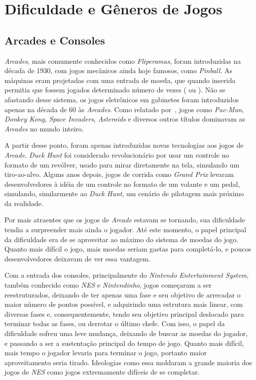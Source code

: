 
\chapter{Dificuldade e Gêneros de Jogos}
\label{cap:dificuldade e generos de jogos}
\section{Arcades e Consoles}

\textit{Arcades}, mais comumente conhecidos como \textit{Fliperamas}, foram introduzidas na década de 1930, com jogos mecânicos ainda hoje famosos, como \textit{Pinball}. As máquinas eram projetadas com uma entrada de moeda, que quando inserida permitia que fossem jogados determinado número de vezes (\textquotedbl{} ou \textquotedbl{}). Não se afastando desse sistema, os jogos eletrônicos em gabinetes foram introduzidos apenas na década de 60 às \textit{Arcades}. Como relatado por~\citet{ArcadeGaming}, jogos como \textit{Pac-Man}, \textit{Donkey Kong}, \textit{Space Invaders}, \textit{Asteroids} e diversos outros títulos dominavam as \textit{Arcades} no mundo inteiro.

A partir desse ponto, foram apenas introduzidas novas tecnologias aos jogos de \textit{Arcade}. \textit{Duck Hunt} foi considerado revolucionário por usar um controle no formato  de um revólver, usado para mirar diretamente na tela, simulando um tiro-ao-alvo. Alguns anos depois, jogos de corrida como \textit{Grand Prix} levaram desenvolvedores à idéia de um controle no formato de um volante e um pedal, simulando, similarmente ao \textit{Duck Hunt}, um cenário de pilotagem mais próximo da realidade.

Por mais atraentes que os jogos de \textit{Arcade} estavam se tornando, sua dificuldade tendia a surpreender mais ainda o jogador. Até este momento, o papel principal da dificuldade era de se aproveitar ao máximo do sistema de moedas do jogo. Quanto mais difícil o jogo, mais moedas seriam gastas para completá-lo, e poucos desenvolvedores deixavam de ver essa vantagem.

Com a entrada dos consoles, principalmente do \textit{Nintendo Entertainment System}, também conhecido como \textit{NES} e \textit{Nintendinho}, jogos começaram a ser reestruturados, deixando de ter apenas uma fase e seu objetivo de arrecadar o maior número de pontos possível, e adquirindo uma estrutura mais linear, com diversas fases e, consequentemente, tendo seu objetivo principal deslocado para terminar todas as fases, ou derrotar o último chefe. Com isso, o papel da dificuldade sofreu uma leve mudança, deixando de buscar as moedas do jogador, e passando a ser a sustentação principal do tempo de jogo. Quanto mais difícil, mais tempo o jogador levaria para terminar o jogo, portanto maior aproveitamento seria tirado. Ideologias como essa moldaram a grande maioria dos jogos de \textit{NES} como jogos extremamente difíceis de se completar.

